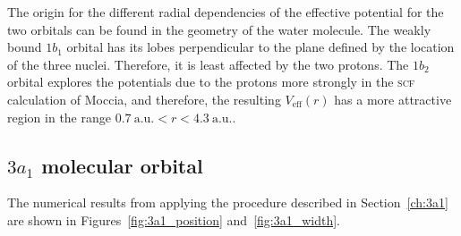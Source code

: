 The origin for the different radial dependencies of the effective
potential for the two orbitals can be found in the geometry of the
water molecule. The weakly bound $1b_{1}$ orbital has its lobes
perpendicular to the plane defined by the location of the three
nuclei. Therefore, it is least affected by the two protons. The
$1b_{2}$ orbital explores the potentials due to the protons more
strongly in the \textsc{scf} calculation of Moccia, and therefore, the
resulting $V_{\mathrm{eff}}(r)$ has a more attractive region in the
range $0.7\ \mathrm{a.u.} < r < 4.3\ \mathrm{a.u.}$.




\subsection{$3a_{1}$ molecular orbital}
\label{ch:3a1_results}

The numerical results from applying the procedure described in
Section~\ref{ch:3a1} are shown in Figures~\ref{fig:3a1_position}
and~\ref{fig:3a1_width}.

